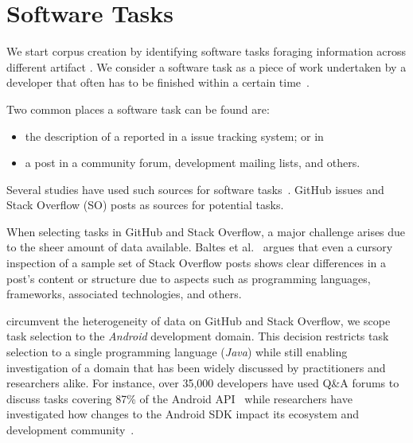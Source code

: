 \section{Software Tasks}
\label{cp4:corpus-tasks}


We start corpus creation by identifying software tasks  
foraging information across different artifact . 
We consider a software task as a piece of work undertaken by a developer that often has to be finished within a certain time~\cite{2004merriam}.


Two common places a software task can be found are:

\begin{itemize}
    \item the description of a  reported in a {issue} tracking system; or in
    \item a post in a community forum, development mailing lists, and others.
\end{itemize}
Several studies have used such  sources for software tasks~\cite{Arya2019, baltes2019, nadi2020, Xu2017}. 
GitHub issues and Stack Overflow (SO) posts as sources for potential tasks.

When selecting tasks in GitHub and Stack Overflow, a major challenge arises due to the sheer amount of data available.
Baltes et al.~\cite{baltes2019} argues that even a cursory inspection of a sample set
of Stack Overflow posts shows clear differences in a post's content or structure due to aspects such as programming languages, frameworks, associated technologies, and others.

circumvent the heterogeneity of data on GitHub and Stack Overflow, we scope task selection to the \textit{Android} development domain. This decision
restricts task selection to a single programming language (\textit{Java})
while still enabling investigation of a domain that has been
widely discussed by practitioners and researchers alike.
For instance, over 35,000 developers have used Q\&A forums to discuss tasks covering 87\% of the Android API~\cite{parnin2012}
while researchers have investigated how changes to the Android SDK impact its ecosystem and development community~\cite{linares2014, bavota2014b, mcdonnell2013}.


